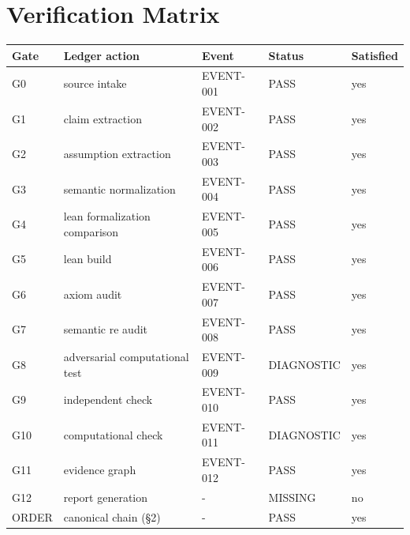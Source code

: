\documentclass[11pt]{article}
\begin{document}
\section{Verification Matrix}
\begin{longtable}{lllll}
\toprule Gate & Ledger action & Event & Status & Satisfied \\ \midrule \endhead
G0 & source intake & EVENT-001 & PASS & yes \\
G1 & claim extraction & EVENT-002 & PASS & yes \\
G2 & assumption extraction & EVENT-003 & PASS & yes \\
G3 & semantic normalization & EVENT-004 & PASS & yes \\
G4 & lean formalization comparison & EVENT-005 & PASS & yes \\
G5 & lean build & EVENT-006 & PASS & yes \\
G6 & axiom audit & EVENT-007 & PASS & yes \\
G7 & semantic re audit & EVENT-008 & PASS & yes \\
G8 & adversarial computational test & EVENT-009 & DIAGNOSTIC & yes \\
G9 & independent check & EVENT-010 & PASS & yes \\
G10 & computational check & EVENT-011 & DIAGNOSTIC & yes \\
G11 & evidence graph & EVENT-012 & PASS & yes \\
G12 & report generation & - & MISSING & no \\
ORDER & canonical chain (\S{}2) & - & PASS & yes \\
\bottomrule
\end{longtable}
\end{document}
